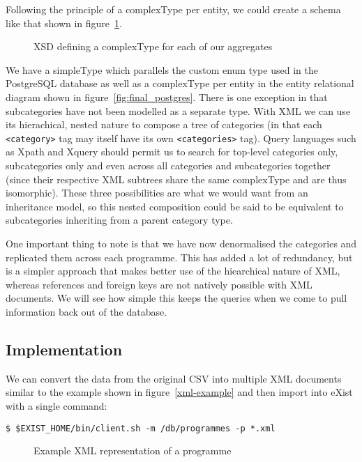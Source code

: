 \documentclass[11pt,a4paper]{article}
\begin{document}
Following the principle of a complexType per entity, we could create
a schema like that shown in figure~\ref{fig:xsd}.

\begin{figure}[p]
  
  \caption{XSD defining a complexType for each of our aggregates}
  \label{fig:xsd}
\end{figure}

We have a simpleType which parallels the custom enum type used in the
PostgreSQL database as well as a complexType per entity in the entity
relational diagram shown in figure~\ref{fig:final_postgres}. There is one
exception in that subcategories have not been modelled as a separate
type. With XML we can use its hierachical, nested nature to compose
a tree of categories (in that each \lstinline|<category>| tag may
itself have its own \lstinline|<categories>| tag). Query languages such
as Xpath and Xquery should permit us to search for top-level categories
only, subcategories only and even across all categories and subcategories
together (since their respective XML subtrees share the same complexType and
are thus isomorphic). These three possibilities are what we would want
from an inheritance model, so this nested composition could be said
to be equivalent to subcategories inheriting from a parent category type.

One important thing to note is that we have now denormalised the
categories and replicated them across each programme. This has
added a lot of redundancy, but is a simpler approach that makes better
use of the hiearchical nature of XML, whereas references and foreign
keys are not natively possible with XML documents. We will see how
simple this keeps the queries when we come to pull information back
out of the database.

\subsection{Implementation}

We can convert the data from the original CSV into multiple XML documents
similar to the example shown in figure~\ref{xml-example} and then import
into eXist with a single command:

\begin{lstlisting}
$ $EXIST_HOME/bin/client.sh -m /db/programmes -p *.xml
\end{lstlisting}

\begin{figure}[p]
  
  \caption{Example XML representation of a programme}
  \label{fig:xml-example}
\end{figure}
\end{document}
